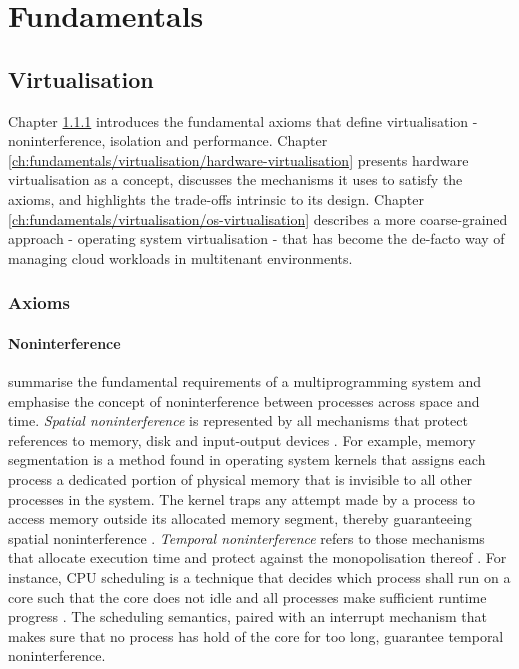 \chapter{Fundamentals}
\section{Virtualisation}
Chapter \ref{ch:fundamentals/virtualisation/axioms} introduces the fundamental axioms that define 
virtualisation - noninterference, isolation and performance. 
Chapter \ref{ch:fundamentals/virtualisation/hardware-virtualisation} presents hardware virtualisation 
as a concept, discusses the mechanisms it uses to satisfy the axioms, and highlights the trade-offs
intrinsic to its design. 
Chapter \ref{ch:fundamentals/virtualisation/os-virtualisation} describes a more coarse-grained 
approach - operating system virtualisation - that has become the de-facto way of managing cloud workloads in 
multitenant environments. 

\subsection{Axioms}
\label{ch:fundamentals/virtualisation/axioms}
\subsubsection{Noninterference}
\label{ch:fundamentals/virtualisation/axioms/noninterference}
\textcite{10.1145/368481.368502} summarise the fundamental requirements of a multiprogramming 
system and emphasise the concept of noninterference between processes across space and time. 
\textit{Spatial noninterference} is represented by all mechanisms that protect references to memory, 
disk and input-output devices \cite{10.1145/368481.368502}. For example, memory segmentation 
is a method found in operating system kernels that assigns each process a dedicated portion
of physical memory that is invisible to all other processes in the system. The kernel traps 
any attempt made by a process to access memory outside its allocated memory segment, thereby 
guaranteeing spatial noninterference \cite{10.5555/2490781}. \textit{Temporal noninterference} refers
to those mechanisms that allocate execution time and protect against the monopolisation thereof 
\cite{10.1145/368481.368502}. For instance, CPU scheduling is a technique that decides which process 
shall run on a core such that the core does not idle and all processes make sufficient 
runtime progress \cite{10.5555/2490781}. The scheduling semantics, paired with an interrupt mechanism 
that makes sure that no process has hold of the core for too long, guarantee temporal noninterference.

